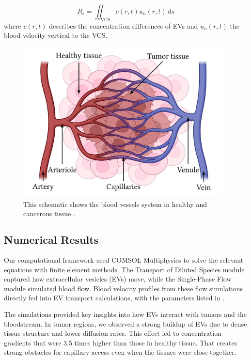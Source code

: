 \documentclass[sigconf]{acmart}
\begin{document}
\begin{equation}
  R_{\text{s}}=\iint_{\text{VCS}}c(r,t)u_{n}(r,t)\,\mathrm{d}s
\end{equation}
where $c(r,t)$ describes the concentration differences of EVs and $u_{n}(r,t)$ the blood velocity vertical to the VCS.

\begin{figure}[h]
  \centering
  \includegraphics[width=\linewidth]{pictures/schematic_bloodvessels.png}
  \caption{This schematic shows the blood vessels system in healthy and cancerous tissue \cite{Zoofaghari_2023}.}
  \Description{}
\end{figure}

\newpage

\subsection{Numerical Results}
\label{sec: num-results}
Our computational framework used COMSOL Multiphysics to solve the relevant equations with finite element methods. The Transport of Diluted Species module captured how extracellular vesicles (EVs) move, while the Single-Phase Flow module simulated blood flow. Blood velocity profiles from these flow simulations directly fed into EV transport calculations, with the parameters listed in \cite{Zoofaghari_2023}.

The simulations provided key insights into how EVs interact with tumors and the bloodstream. In tumor regions, we observed a strong buildup of EVs due to dense tissue structure and lower diffusion rates. This effect led to concentration gradients that were 3.5 times higher than those in healthy tissue. That creates strong obstacles for capillary access even when the tissues were close together.
\end{document}

